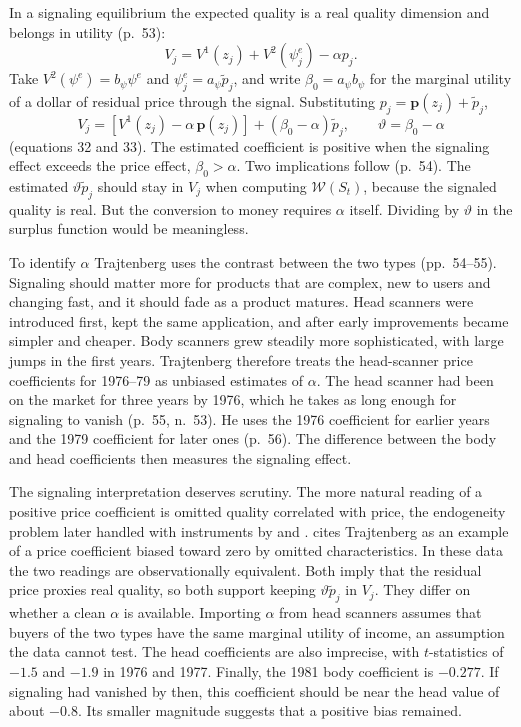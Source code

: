 In a signaling equilibrium the expected quality is a real quality dimension and belongs in utility (p.~53):
\begin{equation*}
V_j = V^1(z_j) + V^2(\psi^e_j) - \alpha p_j .
\end{equation*}
Take $V^2(\psi^e) = b_\psi\psi^e$ and $\psi^e_j = a_\psi\tilde p_j$, and write $\beta_0 = a_\psi b_\psi$ for the
marginal utility of a dollar of residual price through the signal. Substituting $p_j = \mathbf{p}(z_j) + \tilde p_j$,
\begin{equation}\label{eq:10-signal-V}
V_j = \left[V^1(z_j) - \alpha\,\mathbf{p}(z_j)\right] + (\beta_0 - \alpha)\tilde p_j,
\qquad
\vartheta = \beta_0 - \alpha
\end{equation}
(equations 32 and 33). The estimated coefficient is positive when the signaling effect exceeds the price effect,
$\beta_0 > \alpha$. Two implications follow (p.~54). The estimated $\vartheta\tilde p_j$ should stay in $V_j$ when
computing $\mathcal{W}(S_t)$, because the signaled quality is real. But the conversion to money requires $\alpha$
itself. Dividing by $\vartheta$ in the surplus function would be meaningless.

To identify $\alpha$ Trajtenberg uses the contrast between the two types (pp.~54--55). Signaling should matter more
for products that are complex, new to users and changing fast, and it should fade as a product matures. Head scanners
were introduced first, kept the same application, and after early improvements became simpler and cheaper. Body
scanners grew steadily more sophisticated, with large jumps in the first years. Trajtenberg therefore treats the
head-scanner price coefficients for 1976--79 as unbiased estimates of $\alpha$. The head scanner had been on the
market for three years by 1976, which he takes as long enough for signaling to vanish (p.~55, n.~53). He uses the
1976 coefficient for earlier years and the 1979 coefficient for later ones (p.~56). The difference between the body
and head coefficients then measures the signaling effect.

The signaling interpretation deserves scrutiny. The more natural reading of a positive price coefficient is
omitted quality correlated with price, the endogeneity problem later handled with instruments by \citet{Berry1994}
and \citet{BerryLevinsohnPakes1995}.  cites Trajtenberg as an example of a price
coefficient biased toward zero by omitted characteristics. In these data the two readings are observationally
equivalent. Both imply that the residual price proxies real quality, so both support keeping $\vartheta\tilde p_j$
in $V_j$. They differ on whether a clean $\alpha$ is available. Importing $\alpha$ from head scanners assumes that
buyers of the two types have the same marginal utility of income, an assumption the data cannot test. The head coefficients are also imprecise, with $t$-statistics of $-1.5$ and $-1.9$ in 1976 and
1977. Finally, the 1981 body coefficient is $-0.277$. If signaling had vanished by then, this coefficient should be
near the head value of about $-0.8$. Its smaller magnitude suggests that a positive bias remained.

